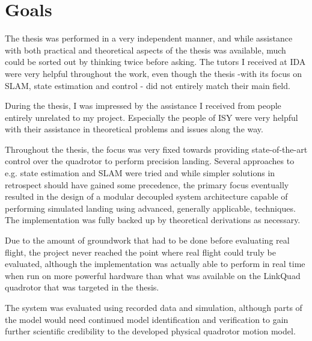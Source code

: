 \section{Goals}
\label{sec:goals}
	The thesis was performed in a very independent manner, and while
	assistance with both practical and theoretical aspects of the thesis 
	was available, much could be sorted out by thinking twice before asking.
	The tutors I received at IDA were very helpful throughout the work, even though
	the thesis -with its focus on SLAM, state estimation and control -
	did not entirely match their main field.
	
	During the thesis, I was impressed by the assistance I received from
	people entirely unrelated to my project. Especially the people of ISY
	were very helpful with their assistance in theoretical problems and issues
	along the way.
	
	Throughout the thesis, the focus was very fixed towards providing state-of-the-art
	control over the quadrotor to perform precision landing. 
	Several approaches to e.g. state estimation and SLAM were tried 
	and while simpler solutions in retrospect should have gained some
	precedence, the primary focus eventually resulted in the design of a modular decoupled
	system architecture capable of performing simulated landing using advanced,
	generally applicable, techniques. The implementation was fully backed up
	by theoretical derivations as necessary.
	
	Due to the amount of groundwork that had to be done before 
	evaluating real flight, the project never reached the point where
	real flight could truly be evaluated, although the implementation
	was actually able to perform in real time when run on more powerful hardware
	than what was available on the LinkQuad quadrotor that was targeted in the thesis.
	
	The system was evaluated using recorded data and simulation, although parts of the
	model would need continued model identification and verification to gain 
	further scientific credibility to the developed physical quadrotor motion model.
